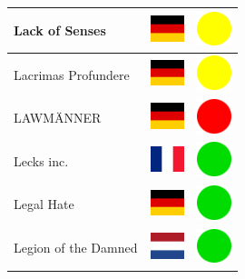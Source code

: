 \documentclass[12pt, a4paper, twoside]{report}
\begin{document}
\begin{center}
\begin{longtable}{|p{5cm}|p{2cm}|p{2cm}|}
Lack of Senses & \includegraphics[width=1cm]{4x3/de} & \includegraphics[width=1cm]{likes/m} \\ \hline
Lacrimas Profundere & \includegraphics[width=1cm]{4x3/de} & \includegraphics[width=1cm]{likes/m} \\ \hline
LAWMÄNNER & \includegraphics[width=1cm]{4x3/de} & \includegraphics[width=1cm]{likes/n} \\ \hline
Lecks inc. & \includegraphics[width=1cm]{4x3/fr} & \includegraphics[width=1cm]{likes/y} \\ \hline
Legal Hate & \includegraphics[width=1cm]{4x3/de} & \includegraphics[width=1cm]{likes/y} \\ \hline
Legion of the Damned & \includegraphics[width=1cm]{4x3/nl} & \includegraphics[width=1cm]{likes/y} \\ \hline

\end{longtable}
\end{center}
\end{document}
